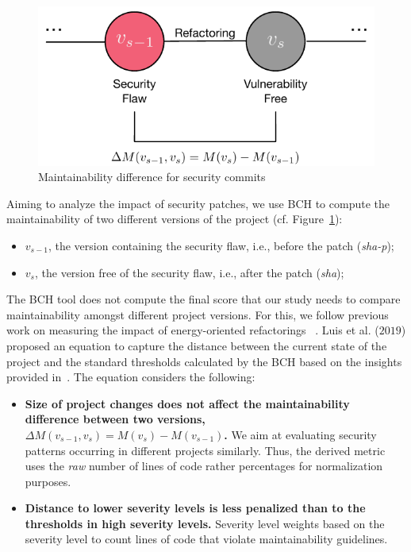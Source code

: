 \documentclass[sigconf,review]{acmart}
\begin{document}
\begin{figure}[h]
 	\centering 	\includegraphics[width=0.75\linewidth]{figures/commit.pdf}
 	\caption{Maintainability difference for security commits}
	\label{fig:commit}
\end{figure}

Aiming to analyze the impact of security patches, we use BCH to compute the
maintainability of two different versions of the project (cf. Figure~\ref{fig:commit}):
\begin{itemize}
	\item $v_{s-1}$, the version containing the security flaw, i.e., before the
	patch (\emph{sha-p});
	\item $v_{s}$, the version free of the security flaw, i.e., after the
	patch (\emph{sha});
\end{itemize}

The BCH tool does not compute the final score that our study needs to compare
maintainability amongst different project versions. For this, we
follow previous work on measuring the impact of energy-oriented refactorings
~\cite{cruz2019energyoriented}. Luis et al. ($2019$) proposed an equation
to capture the distance between the current state of the project and
the standard thresholds calculated by the BCH based on the insights provided in~\cite{Olivari:2018}. 
The equation considers the following:
\begin{itemize}
	\item \textbf{Size of project changes does not affect the maintainability
	difference between two versions, $\Delta M (v_{s-1},v_{s}) = M(v_{s}) - M(v_{s-1})$.} We
	aim at evaluating security patterns occurring in different projects similarly.
	Thus, the derived metric uses the \textit{raw} number of lines of code rather
  percentages for normalization purposes.
	\item \textbf{Distance to lower severity levels is less penalized than to the
	thresholds in high severity levels.} Severity level weights based on the
	severity level to count lines of code that violate maintainability guidelines.
\end{itemize}
\end{document}
